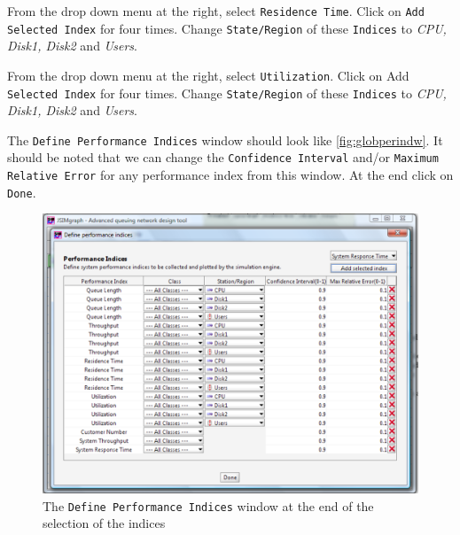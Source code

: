 \begin{itemize*}
\item From the drop down menu at the right, select
\texttt{Residence Time}. Click on \texttt{Add Selected Index} for
four times. Change \texttt{State/Region} of these \texttt{Indices}
to \emph{CPU, Disk1, Disk2} and \emph{Users}.

\item From the drop down menu at the right, select
\texttt{Utilization}. Click on Add \texttt{Selected Index} for
four times. Change \texttt{State/Region} of these \texttt{Indices}
to \emph{CPU, Disk1, Disk2} and \emph{Users}.
\end{itemize*}
The \texttt{Define Performance Indices} window should look like
\autoref{fig:globperindw}. It should be noted that we can change
the \texttt{Confidence Interval} and/or \texttt{Maximum Relative
Error} for any performance index from this window. At the end
click on \texttt{Done}.\\
\begin{figure}[htb]
    \begin{center}
        \includegraphics[scale=.5]{img/jsimg/12.13.eps}
    \end{center}
    \caption{The \texttt{Define Performance Indices} window at the end
    of the selection of the indices}
    \label{fig:globperindw}
\end{figure}

